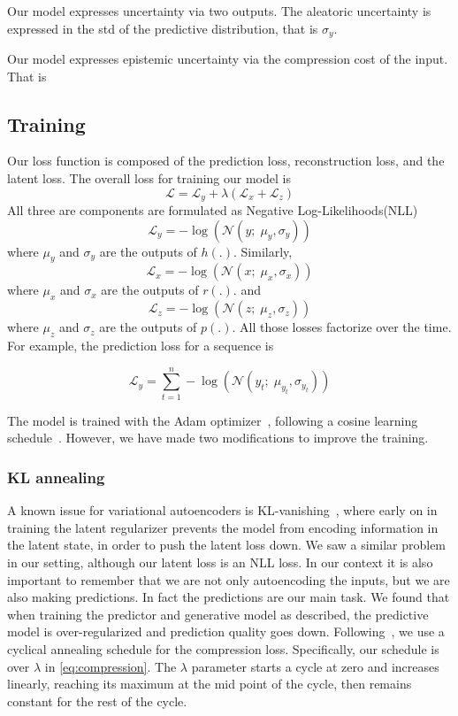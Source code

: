 \documentclass[../main.tex]{subfiles}
\begin{document}
Our model expresses uncertainty via two outputs. The aleatoric uncertainty is expressed in the std of the predictive distribution, that is $\sigma_y$.

Our model expresses epistemic uncertainty via the compression cost of the input. That is 


\subsection{Training}

Our loss function is composed of the prediction loss, reconstruction loss, and the latent loss.
The overall loss for training our model is 
\begin{equation}
    \label{eq:overall_loss}
    \mathcal{L} = \mathcal{L}_{y} + \lambda (\mathcal{L}_{x} + \mathcal{L}_{z})
\end{equation}{}
All three are components are formulated as Negative Log-Likelihoods(NLL)
$$
    \mathcal{L}_{y} = -\log (\mathcal{N}(y; \; \mu_y, \sigma_y))
$$
where $\mu_y$ and $\sigma_y$ are the outputs of $h(.)$. Similarly, 
$$
    \mathcal{L}_{x} = -\log(\mathcal{N}(x; \; \mu_x, \sigma_x))
$$
where $\mu_x$ and $\sigma_x$ are the outputs of $r(.)$. and 
$$
    \mathcal{L}_{z} = -\log(\mathcal{N}(z; \; \mu_z, \sigma_z))
$$
where $\mu_z$ and $\sigma_z$ are the outputs of $p(.)$. All those losses factorize over the time. For example, the prediction loss for a sequence is

\begin{equation}
    \mathcal{L}_{y} = \sum_{t=1}^{n} -\log (\mathcal{N}(y_t; \; \mu_{y_t}, \sigma_{y_t}))
\end{equation}{}

The model is trained with the Adam optimizer~\citep{kingma2014adam}, following a cosine learning schedule~\citep{loshchilov2016sgdr}. However, we have made two modifications to improve the training.

\subsubsection{KL annealing}

A known issue for variational autoencoders is KL-vanishing~\citep{bowman2015generating}, where early on in training the latent regularizer prevents the model from encoding information in the latent state, in order to push the latent loss down. We saw a similar problem in our setting, although our latent loss is an NLL loss. In our context it is also important to remember that we are not only autoencoding the inputs, but we are also making predictions. In fact the predictions are our main task. We found that when training the predictor and generative model as described, the predictive model is over-regularized and prediction quality goes down. Following~\citep{liu2019cyclical}, we use a cyclical annealing schedule for the compression loss. Specifically, our schedule is over $\lambda$ in \cref{eq:compression}. The $\lambda$ parameter starts a cycle at zero and increases linearly, reaching its maximum at the mid point of the cycle, then remains constant for the rest of the cycle. 
\end{document}
